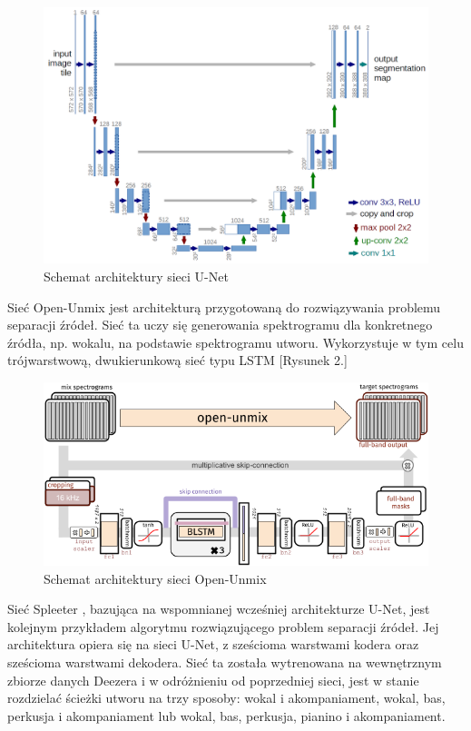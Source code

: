 \documentclass{article}
\begin{document}
\begin{figure}
\centering
\includegraphics[width=0.75\linewidth]{unet.png}
\caption{\label{fig:unet}Schemat architektury sieci U-Net}
\end{figure}


Sieć Open-Unmix \cite{Stöter2019} jest architekturą przygotowaną do rozwiązywania problemu separacji źródeł. Sieć ta uczy się generowania spektrogramu dla konkretnego źródła, np. wokalu, na podstawie spektrogramu utworu. Wykorzystuje w tym celu trójwarstwową, dwukierunkową sieć typu LSTM [Rysunek 2.]\\

\begin{figure}
\centering
\includegraphics[width=0.75\linewidth]{open-unmix.png}
\caption{\label{fig:unet}Schemat architektury sieci Open-Unmix}
\end{figure}


Sieć Spleeter \cite{spleeter}, bazująca na wspomnianej wcześniej architekturze U-Net, jest kolejnym przykładem algorytmu rozwiązującego problem separacji źródeł. Jej architektura opiera się na sieci U-Net, z sześcioma warstwami kodera oraz sześcioma warstwami dekodera. Sieć ta została wytrenowana na wewnętrznym zbiorze danych Deezera i w odróżnieniu od poprzedniej sieci, jest w stanie rozdzielać ścieżki utworu na trzy sposoby: wokal i akompaniament, wokal, bas, perkusja i akompaniament lub wokal, bas, perkusja, pianino i akompaniament.\\
\end{document}
